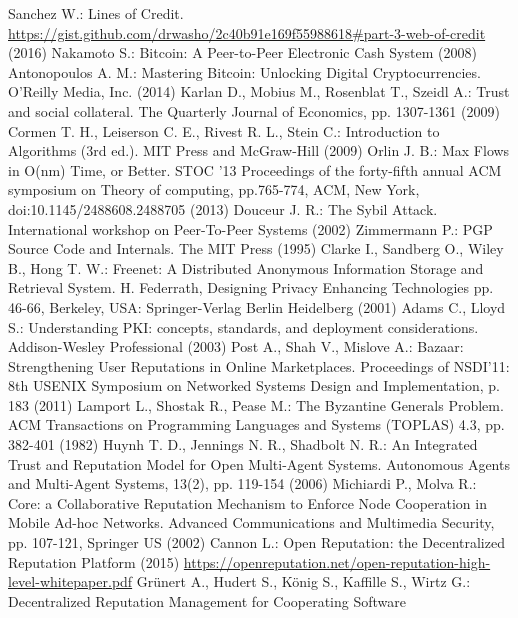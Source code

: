 \begin{thebibliography}{40}
  Sanchez W.: Lines of Credit. \url{https://gist.github.com/drwasho/2c40b91e169f55988618#part-3-web-of-credit} (2016)
  Nakamoto S.: Bitcoin: A Peer-to-Peer Electronic Cash System (2008)
  Antonopoulos A. M.: Mastering Bitcoin: Unlocking Digital Cryptocurrencies. O'Reilly Media, Inc. (2014)
  Karlan D., Mobius M., Rosenblat T., Szeidl A.: Trust and social collateral. The Quarterly Journal of Economics, pp.
  1307-1361 (2009)
  Cormen T. H., Leiserson C. E., Rivest R. L., Stein C.: Introduction to Algorithms (3rd ed.). MIT Press and McGraw-Hill
  (2009)
  Orlin J. B.: Max Flows in O(nm) Time, or Better. STOC '13 Proceedings of the forty-fifth annual ACM symposium on Theory
  of computing, pp.765-774, ACM, New York, doi:10.1145/2488608.2488705 (2013)
  Douceur J. R.: The Sybil Attack. International workshop on Peer-To-Peer Systems (2002)
  Zimmermann P.: PGP Source Code and Internals. The MIT Press (1995)
  Clarke I., Sandberg O., Wiley B., Hong T. W.: Freenet: A Distributed Anonymous Information Storage and
  Retrieval System. H. Federrath, Designing Privacy Enhancing Technologies pp. 46-66, Berkeley, USA: Springer-Verlag
  Berlin Heidelberg (2001)
  Adams C., Lloyd S.: Understanding PKI: concepts, standards, and deployment considerations. Addison-Wesley Professional
  (2003)
  Post A., Shah V., Mislove A.: Bazaar: Strengthening User Reputations in Online Marketplaces. Proceedings of NSDI'11:
  8th USENIX Symposium on Networked Systems Design and Implementation, p. 183 (2011)
  Lamport L., Shostak R., Pease M.: The Byzantine Generals Problem. ACM Transactions on Programming Languages and Systems
  (TOPLAS) 4.3, pp. 382-401 (1982)
  Huynh T. D., Jennings N. R., Shadbolt N. R.: An Integrated Trust and Reputation Model for Open Multi-Agent Systems.
  Autonomous Agents and Multi-Agent Systems, 13(2), pp. 119-154 (2006)
  Michiardi P., Molva R.: Core: a Collaborative Reputation Mechanism to Enforce Node Cooperation in Mobile Ad-hoc
  Networks. Advanced Communications and Multimedia Security, pp. 107-121, Springer US (2002)
  Cannon L.: Open Reputation: the Decentralized Reputation Platform (2015)
  \url{https://openreputation.net/open-reputation-high-level-whitepaper.pdf}
  Gr\"unert A., Hudert S., K\"onig S., Kaffille S., Wirtz G.: Decentralized Reputation Management for Cooperating Software

\end{thebibliography}
